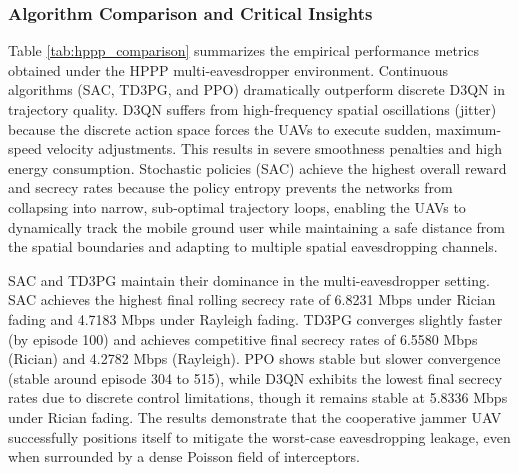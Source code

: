 \documentclass[journal,onecolumn]{IEEEtran}
\begin{document}
\subsubsection{Algorithm Comparison and Critical Insights}
Table \ref{tab:hppp_comparison} summarizes the empirical performance metrics obtained under the HPPP multi-eavesdropper environment. Continuous algorithms (SAC, TD3PG, and PPO) dramatically outperform discrete D3QN in trajectory quality. D3QN suffers from high-frequency spatial oscillations (jitter) because the discrete action space forces the UAVs to execute sudden, maximum-speed velocity adjustments. This results in severe smoothness penalties and high energy consumption. 
Stochastic policies (SAC) achieve the highest overall reward and secrecy rates because the policy entropy prevents the networks from collapsing into narrow, sub-optimal trajectory loops, enabling the UAVs to dynamically track the mobile ground user while maintaining a safe distance from the spatial boundaries and adapting to multiple spatial eavesdropping channels.

SAC and TD3PG maintain their dominance in the multi-eavesdropper setting. SAC achieves the highest final rolling secrecy rate of 6.8231 Mbps under Rician fading and 4.7183 Mbps under Rayleigh fading. TD3PG converges slightly faster (by episode 100) and achieves competitive final secrecy rates of 6.5580 Mbps (Rician) and 4.2782 Mbps (Rayleigh). PPO shows stable but slower convergence (stable around episode 304 to 515), while D3QN exhibits the lowest final secrecy rates due to discrete control limitations, though it remains stable at 5.8336 Mbps under Rician fading. The results demonstrate that the cooperative jammer UAV successfully positions itself to mitigate the worst-case eavesdropping leakage, even when surrounded by a dense Poisson field of interceptors.
\end{document}
